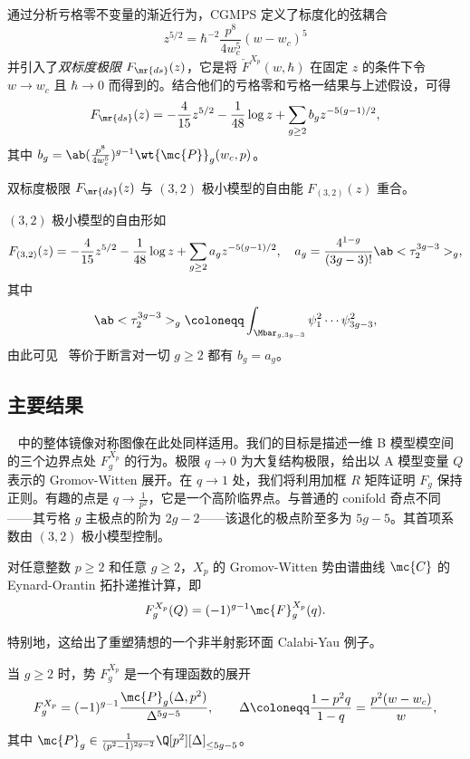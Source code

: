 通过分析亏格零不变量的渐近行为，CGMPS 定义了标度化的弦耦合
\[ z^{5/2} = \hbar^{-2} \frac{p^8}{4w_c^5}(w-w_c)^5 \]
并引入了\textit{双标度极限} \(F_{\mr{ds}}(z)\)，它是将 \(\check{F}^{X_p}(w,\hbar)\) 在固定 \(z\) 的条件下令 \(w \to w_c\) 且 \(\hbar \to 0\) 而得到的。结合他们的亏格零和亏格一结果与上述假设，可得
\[ F_{\mr{ds}}(z) = -\frac{4}{15}z^{5/2} - \frac{1}{48}\log z + \sum_{g \geq 2} b_g z^{-5(g-1)/2}, \]
其中 \(b_g = \ab(\frac{p^8}{4w_c^5})^{g-1}\wt{\mc{P}}_g(w_c,p)\)。

\begin{conj}%
\label{conj:cgmps}
    双标度极限 \(F_{\mr{ds}}(z)\) 与 \((3,2)\) 极小模型的自由能 \(F_{(3,2)}(z)\) 重合。
\end{conj}

\((3,2)\) 极小模型的自由形如
\[ F_{(3,2)}(z) = -\frac{4}{15}z^{5/2} - \frac{1}{48}\log z + \sum_{g\geq2} a_g z^{-5(g-1)/2}, \quad a_g = \frac{4^{1-g}}{(3g-3)!}\ab<\tau_2^{3g-3}>_g, \]
其中
\[ \ab<\tau_2^{3g-3}>_g \coloneqq \int_{\Mbar_{g,3g-3}} \psi_1^2 \cdots \psi_{3g-3}^2, \]
由此可见~ 等价于断言对一切 \(g \geq 2\) 都有 \(b_g = a_g\)。

\subsection{主要结果}%
\label{sub:The main results (Guo local P1)}

~ 中的整体镜像对称图像在此处同样适用。我们的目标是描述一维 B 模型模空间的三个边界点处 \(F_g^{X_p}\) 的行为。极限 \(q \to 0\) 为大复结构极限，给出以 A 模型变量 \(Q\) 表示的 Gromov-Witten 展开。在 \(q \to 1\) 处，我们将利用加框 \(R\) 矩阵证明 \(F_g\) 保持正则。有趣的点是 \(q \to \frac{1}{p^2}\)，它是一个高阶临界点。与普通的 conifold 奇点不同——其亏格 \(g\) 主极点的阶为 \(2g-2\)——该退化的极点阶至多为 \(5g-5\)。其首项系数由 \((3,2)\) 极小模型控制。

\begin{thm}%
\label{thm:local P1 mirror symmetry}
    对任意整数 \(p \geq 2\) 和任意 \(g \geq 2\)，\(X_p\) 的 Gromov-Witten 势由谱曲线 \(\mc{C}\) 的 Eynard-Orantin 拓扑递推计算，即
    \[ F_g^{X_p}(Q) = (-1)^{g-1}\mc{F}_g^{X_p}(q). \]
\end{thm}

特别地，这给出了重塑猜想的一个非半射影环面 Calabi-Yau 例子。

\begin{thm}%
\label{thm:local P1 rationality}
    当 \(g \geq 2\) 时，势 \(F_g^{X_p}\) 是一个有理函数的展开
    \[ F_g^{X_p} = (-1)^{g-1}\frac{\mc{P}_g(\Delta,p^2)}{\Delta^{5g-5}}, \qquad \Delta \coloneqq \frac{1-p^2q}{1-q} = \frac{p^2(w-w_c)}{w}, \]
    其中 \(\mc{P}_g \in \frac{1}{(p^2-1)^{2g-2}}\Q[p^2][\Delta]_{\leq 5g-5}\)。
\end{thm}

